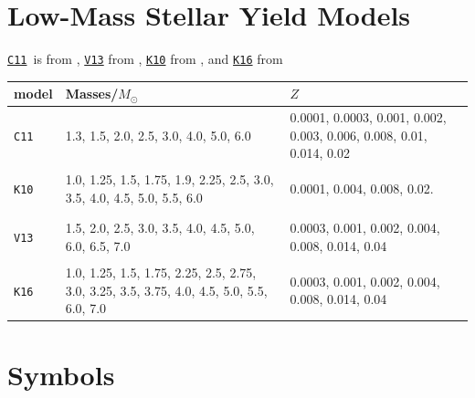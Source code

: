 \documentclass[12pt,oneside,letterpaper]{report}
\newcommand{\cxi}{\texttt{\hyperlink{C11}{C11}}}
\newcommand{\kx}{\texttt{\hyperlink{K10}{K10}}}
\newcommand{\kxvi}{\texttt{\hyperlink{K16}{K16}}}
\newcommand{\vxiii}{\texttt{\hyperlink{V13}{V13}}}
\begin{document}
\chapter{Low-Mass Stellar Yield Models} \label{sec:oob_models}
    \cxi\ is from \citet{cristallo+11,cristallo+15}, \vxiii{} from \cite{ventura+13,ventura+14,ventura+18,vincenzo+21}, \kx{} from \citet{karakas10}, and \kxvi{} from \cite{KL16,karakas+18}
\renewcommand*{\arraystretch}{1.8}
\begin{table}[h]
    \centering
    \begin{tabular}{l p{2.2in} p{2.2in}}
    \toprule
    model & Masses/$M_\odot$ & $Z$ \\
    \midrule
    \hypertarget{C11}{\texttt{C11}} &
    1.3, 1.5, 2.0, 2.5, 3.0, 4.0, 5.0, 6.0
    & 0.0001, 0.0003, 0.001, 0.002, 0.003, 0.006, 0.008, 0.01, 0.014, 0.02 \\

    \hypertarget{K10}{\texttt{K10}} &
    1.0, 1.25, 1.5, 1.75, 1.9, 2.25, 2.5, 3.0, 3.5, 4.0, 4.5, 5.0, 5.5, 6.0 
    &  0.0001, 0.004, 0.008, 0.02. \\
    
    \hypertarget{V13}{\texttt{V13}} 
    & 1.5, 2.0, 2.5, 3.0, 3.5, 4.0, 4.5, 5.0, 6.0, 6.5, 7.0
    & 0.0003, 0.001, 0.002, 0.004, 0.008, 0.014, 0.04 \\
    
    \hypertarget{K16}{\texttt{K16}} 
     & 1.0, 1.25, 1.5, 1.75, 2.25, 2.5, 2.75, 3.0, 3.25, 3.5, 3.75, 4.0, 4.5, 5.0, 5.5, 6.0, 7.0
     & 0.0003, 0.001, 0.002, 0.004, 0.008, 0.014, 0.04 \\
         \bottomrule
    \end{tabular}
\end{table}
    

\chapter{Symbols}
\end{document}
